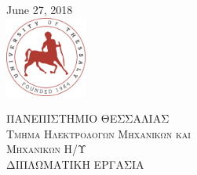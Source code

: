 \begin{titlepage}

%
{\large June 27, 2018}\\[3cm] %


\includegraphics[width=0.2\textwidth]{Images/uth_logo}\\[1cm] %
 

\vfill %


\newpage
\center %
 
\textsc{\LARGE \textgreek{ΠΑΝΕΠΙΣΤΗΜΙΟ ΘΕΣΣΑΛΙΑΣ}}\\[1.5cm] %
\textsc{\Large \textgreek{Τμήμα Ηλεκτρολόγων Μηχανικών και \\ Μηχανικών Η/Υ}}\\[0.5cm] %
\textsc{\large \textgreek{ΔΙΠΛΩΜΑΤΙΚΗ ΕΡΓΑΣΙΑ}}\\[0.5cm] %


\end{titlepage}
